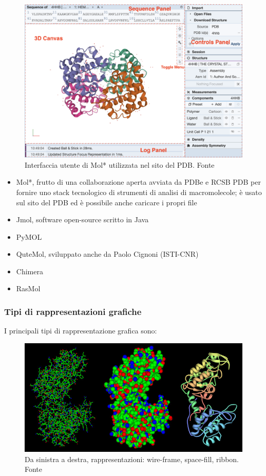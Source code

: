 \begin{figure}[!htb]
	\centering
	\includegraphics[scale=0.7]{images/molstar.png}
	\caption{Interfaccia utente di Mol* utilizzata nel sito del PDB. Fonte\cite{pdbStats}}
	\label{fig:ui-molstar}
\end{figure}

\begin{itemize}
	\item Mol*, frutto di una collaborazione aperta avviata da PDBe e RCSB PDB per fornire uno stack tecnologico di strumenti di analisi di macromolecole; è usato sul sito del PDB ed è possibile anche caricare i propri file
	\item Jmol, software open-source scritto in Java 
	\item PyMOL
	\item QuteMol, sviluppato anche da Paolo Cignoni (ISTI-CNR)
	\item Chimera
	\item RasMol
\end{itemize}

\subsubsection{Tipi di rappresentazioni grafiche}

I principali tipi di rappresentazione grafica sono: 

\begin{figure}[!htb]
	\centering
	\includegraphics[scale=0.6]{images/rappresentazioni.jpg}
	\caption{Da sinistra a destra, rappresentazioni: wire-frame, space-fill, ribbon. Fonte\cite{pdbStats}}
	\label{fig:rappresentaizoni}
\end{figure}

